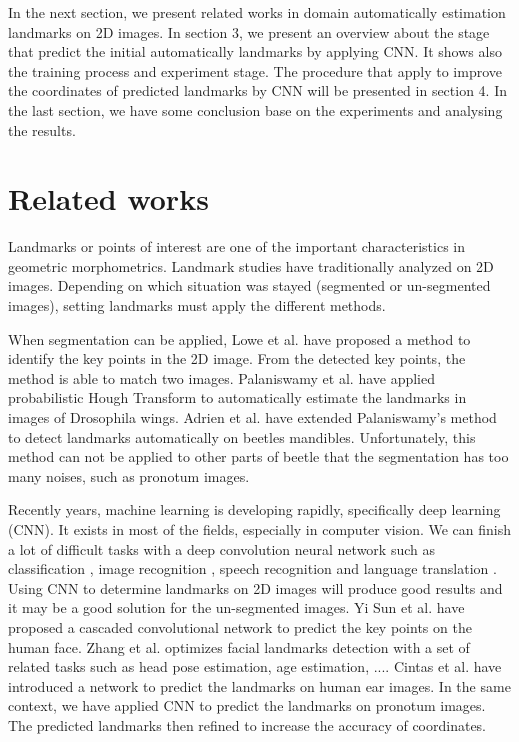 \documentclass[10pt]{article}
\begin{document}
In the next section, we present related works in domain automatically estimation landmarks on 2D images. In section 3, we present an overview about the stage that predict the initial automatically landmarks by applying CNN. It shows also the training process and experiment stage. The procedure that apply to improve the coordinates of predicted landmarks by CNN will be presented in section 4. In the last section, we have some conclusion base on the experiments and analysing the results.

\section{Related works}
Landmarks or points of interest are one of the important characteristics in geometric morphometrics. Landmark studies have traditionally analyzed on 2D images. Depending on which situation was stayed (segmented or un-segmented images), setting landmarks must apply the different methods.

When segmentation can be applied, Lowe et al. \cite{lowe2004distinctive} have proposed a method to identify the key points in the 2D image. From the detected key points, the method is able to match two images. Palaniswamy et al. \cite{palaniswamy2010automatic} have applied probabilistic Hough Transform to automatically estimate the landmarks in images of Drosophila wings. Adrien et al. \cite{le2017maelab} have extended Palaniswamy's method to detect landmarks automatically on beetles mandibles. Unfortunately, this method can not be applied to other parts of beetle that the segmentation has too many noises, such as pronotum images.

Recently years, machine learning is developing rapidly, specifically deep learning (CNN). It exists in most of the fields, especially in computer vision. We can finish a lot of difficult tasks with a deep convolution neural network such as classification \cite{krizhevsky2012imagenet, ciregan2012multi}, image recognition \cite{szegedy2015going, farabet2013learning, li2015convolutional}, speech recognition \cite{mikolov2011strategies, hinton2012deep} and language translation \cite{jean2014using, sutskever2014sequence}. Using CNN to determine landmarks on 2D images will produce good results and it may be a good solution for the un-segmented images. Yi Sun et al. \cite{sun2013deep} have proposed a cascaded convolutional network to predict the key points on the human face. Zhang et al. \cite{zhang2014facial} optimizes facial landmarks detection with a set of related tasks such as head pose estimation, age estimation, .... Cintas et al. \cite{cintas2016automatic} have introduced a network to predict the landmarks on human ear images. In the same context, we have applied CNN to predict the landmarks on pronotum images. The predicted landmarks then refined to increase the accuracy of coordinates.
\end{document}
